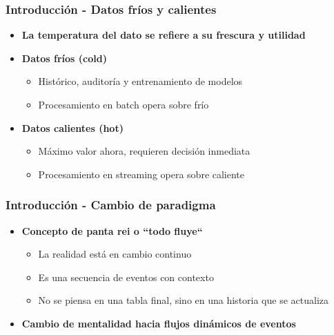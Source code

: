 \documentclass[aspectratio=169]{beamer}
\begin{document}
\begin{frame}
\frametitle{Introducción - Datos fríos y calientes}
	\begin{itemize}
		\item \textbf{La temperatura del dato se refiere a su frescura y utilidad}

		\vspace{1em}

    \item \textbf{Datos fríos (cold)}
		\begin{itemize}
			\item Histórico, auditoría y entrenamiento de modelos
			\item Procesamiento en batch opera sobre frío
		\end{itemize}

		\vspace{1em}

    \item \textbf{Datos calientes (hot)}
		\begin{itemize}
			\item Máximo valor ahora, requieren decisión inmediata
			\item Procesamiento en streaming opera sobre caliente
		\end{itemize}

	\end{itemize}
\end{frame}

\begin{frame}
\frametitle{Introducción - Cambio de paradigma}
	\begin{itemize}

    \item \textbf{Concepto de panta rei o ``todo fluye``}
		\begin{itemize}
      \item La realidad está en cambio continuo
			\item Es una secuencia de eventos con contexto
			\item No se piensa en una tabla final, sino en una historia que se actualiza
		\end{itemize}

		\vspace{1em}

		\item \textbf{Cambio de mentalidad hacia flujos dinámicos de eventos}
	\end{itemize}
\end{frame}
\end{document}
